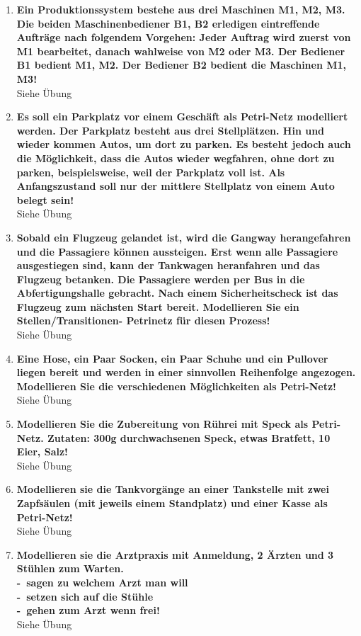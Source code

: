 \documentclass[a4paper,12pt]{article}
\newcommand{\statementnopage}[2]{\pagebreak[3]\item {\textbf{#1!}}#2}
\newcommand{\catchword}[1]{\\-\ #1}
\newcommand{\normaltext}[1]{\\#1}
\begin{document}
\begin{enumerate}
  \statementnopage{Ein Produktionssystem bestehe aus drei Maschinen M1, M2, M3. Die
                   beiden Maschinenbediener B1, B2 erledigen eintreffende Aufträge
                   nach folgendem Vorgehen: Jeder Auftrag wird zuerst von M1
                   bearbeitet, danach wahlweise von M2 oder M3. Der Bediener B1
                   bedient M1, M2. Der Bediener B2 bedient die Maschinen M1, M3}
  {
    \normaltext{Siehe Übung}
  }

  \statementnopage{Es soll ein Parkplatz vor einem Geschäft als Petri-Netz
                   modelliert werden. Der Parkplatz besteht aus drei Stellplätzen.
                   Hin und wieder kommen Autos, um dort zu parken. Es besteht jedoch
                   auch die Möglichkeit, dass die Autos wieder wegfahren, ohne dort
                   zu parken, beispielsweise, weil der Parkplatz voll ist. Als
                   Anfangszustand soll nur der mittlere Stellplatz von einem Auto
                   belegt sein}
  {
    \normaltext{Siehe Übung}
  }

  \statementnopage{Sobald ein Flugzeug gelandet ist, wird die Gangway herangefahren
                   und die Passagiere können aussteigen. Erst wenn alle Passagiere
                   ausgestiegen sind, kann der Tankwagen heranfahren und das Flugzeug
                   betanken. Die Passagiere werden per Bus in die Abfertigungshalle
                   gebracht. Nach einem Sicherheitscheck ist das Flugzeug zum
                   nächsten Start bereit. Modellieren Sie ein Stellen/Transitionen-
                   Petrinetz für diesen Prozess}
  {
    \normaltext{Siehe Übung}
  }

  \statementnopage{Eine Hose, ein Paar Socken, ein Paar Schuhe und ein Pullover liegen
                   bereit und werden in einer sinnvollen Reihenfolge angezogen.
                   Modellieren Sie die verschiedenen Möglichkeiten als Petri-Netz}
  {
    \normaltext{Siehe Übung}
  }

  \statementnopage{Modellieren Sie die Zubereitung von Rührei mit Speck als Petri-Netz.
                   Zutaten: 300g durchwachsenen Speck, etwas Bratfett, 10 Eier, Salz}
  {
    \normaltext{Siehe Übung}
  }

  \statementnopage{Modellieren sie die Tankvorgänge an einer Tankstelle mit zwei
                   Zapfsäulen (mit jeweils einem Standplatz) und einer Kasse als Petri-Netz}
  {
    \normaltext{Siehe Übung}
  }

  \statementnopage{Modellieren sie die Arztpraxis mit Anmeldung, 2 Ärzten und 3 Stühlen zum Warten.
  \catchword{sagen zu welchem Arzt man will}
  \catchword{setzen sich auf die Stühle}
  \catchword{gehen zum Arzt wenn frei}}
  {
    \normaltext{Siehe Übung}
  }

\end{enumerate}

\printindex
\end{document}
